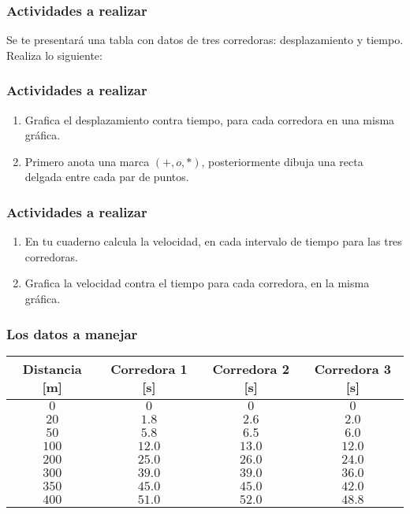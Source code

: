 \documentclass[14pt]{beamer}
\begin{document}
\begin{frame}
\frametitle{Actividades a realizar}
Se te presentará una tabla con datos de tres corredoras: desplazamiento y tiempo.
\\
\bigskip
\pause
Realiza lo siguiente:
\end{frame}
\begin{frame}
\frametitle{Actividades a realizar}
\begin{enumerate}[<+->]
\item Grafica el desplazamiento contra tiempo, para cada corredora en una misma gráfica.
\item Primero anota una marca $(+, o, *)$, posteriormente dibuja una recta delgada entre cada par de puntos.
\seti
\end{enumerate}
\end{frame}
\begin{frame}
\frametitle{Actividades a realizar}
\begin{enumerate}[<+->]
\conti    
\item En tu cuaderno calcula la velocidad, en cada intervalo de tiempo para las tres corredoras.
\item Grafica la velocidad contra el tiempo para cada corredora, en la misma gráfica.
\end{enumerate}
\end{frame}
\begin{frame}
\frametitle{Los datos a manejar}
\begin{table}
\centering
\small
\renewcommand{\arraystretch}{1}
\begin{tabular}{c | c | c | c }
Distancia [m] & Corredora 1 [s] & Corredora 2 [s] & Corredora 3 [s] \\ \hline
$0$ & $0$ & $0$ & $0$ \\ \hline
$20$ & $1.8$ & $2.6$ & $2.0$ \\ \hline
$50$ & $5.8$ & $6.5$ & $6.0$ \\ \hline
$100$ & $12.0$ & $13.0$ & $12.0$ \\ \hline
$200$ & $25.0$ & $26.0$ & $24.0$ \\ \hline
$300$ & $39.0$ & $39.0$ & $36.0$ \\ \hline
$350$ & $45.0$ & $45.0$ & $42.0$ \\ \hline
$400$ & $51.0$ & $52.0$ & $48.8$ \\ \hline
\end{tabular}
\end{table}
\end{frame}
\end{document}
